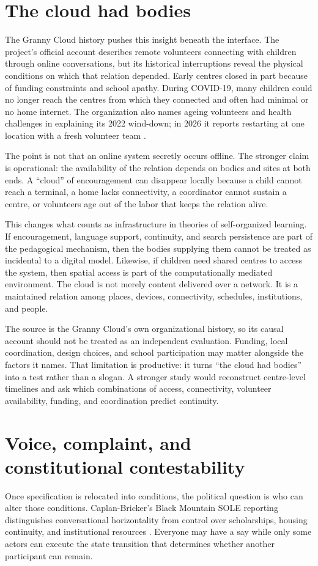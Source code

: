 \documentclass[11pt]{article}
\begin{document}
\section{The cloud had bodies}
The Granny Cloud history pushes this insight beneath the interface. The project's official account describes remote volunteers connecting with children through online conversations, but its historical interruptions reveal the physical conditions on which that relation depended. Early centres closed in part because of funding constraints and school apathy. During COVID-19, many children could no longer reach the centres from which they connected and often had minimal or no home internet. The organization also names ageing volunteers and health challenges in explaining its 2022 wind-down; in 2026 it reports restarting at one location with a fresh volunteer team \cite{grannycloud_background}.

The point is not that an online system secretly occurs offline. The stronger claim is operational: the availability of the relation depends on bodies and sites at both ends. A ``cloud'' of encouragement can disappear locally because a child cannot reach a terminal, a home lacks connectivity, a coordinator cannot sustain a centre, or volunteers age out of the labor that keeps the relation alive.

This changes what counts as infrastructure in theories of self-organized learning. If encouragement, language support, continuity, and search persistence are part of the pedagogical mechanism, then the bodies supplying them cannot be treated as incidental to a digital model. Likewise, if children need shared centres to access the system, then spatial access is part of the computationally mediated environment. The cloud is not merely content delivered over a network. It is a maintained relation among places, devices, connectivity, schedules, institutions, and people.

The source is the Granny Cloud's own organizational history, so its causal account should not be treated as an independent evaluation. Funding, local coordination, design choices, and school participation may matter alongside the factors it names. That limitation is productive: it turns ``the cloud had bodies'' into a test rather than a slogan. A stronger study would reconstruct centre-level timelines and ask which combinations of access, connectivity, volunteer availability, funding, and coordination predict continuity.

\section{Voice, complaint, and constitutional contestability}
Once specification is relocated into conditions, the political question is who can alter those conditions. Caplan-Bricker's Black Mountain SOLE reporting distinguishes conversational horizontality from control over scholarships, housing continuity, and institutional resources \cite{caplanbricker2013blackmountain}. Everyone may have a say while only some actors can execute the state transition that determines whether another participant can remain.
\end{document}
